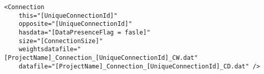 \begin{verbatim}
<Connection
    this="[UniqueConnectionId]"
    opposite="[UniqueConnectionId]"
    hasdata="[DataPresenceFlag = fasle]"
    size="[ConnectionSize]"
    weightsdatafile="[ProjectName]_Connection_[UniqueConnectionId]_CW.dat"
    datafile="[ProjectName]_Connection_[UniqueConnectionId]_CD.dat" />
\end{verbatim}
